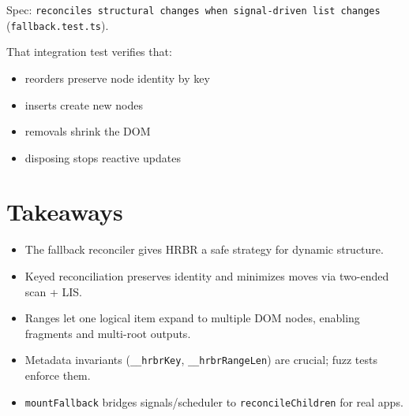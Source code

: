 \begin{center}
\end{center}

Spec: \texttt{reconciles structural changes when signal-driven list changes} (\texttt{fallback.test.ts}).

That integration test verifies that:

\begin{itemize}
  \item reorders preserve node identity by key
  \item inserts create new nodes
  \item removals shrink the DOM
  \item disposing stops reactive updates
\end{itemize}

\section{Takeaways}

\begin{itemize}
  \item The fallback reconciler gives HRBR a safe strategy for dynamic structure.
  \item Keyed reconciliation preserves identity and minimizes moves via two-ended scan + LIS.
  \item Ranges let one logical item expand to multiple DOM nodes, enabling fragments and multi-root outputs.
  \item Metadata invariants (\texttt{\_\_hrbrKey}, \texttt{\_\_hrbrRangeLen}) are crucial; fuzz tests enforce them.
  \item \texttt{mountFallback} bridges signals/scheduler to \texttt{reconcileChildren} for real apps.
\end{itemize}

